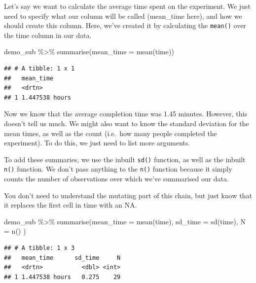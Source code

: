 \documentclass[
]{book}
\newenvironment{Shaded}{\begin{snugshade}}{\end{snugshade}}
\newcommand{\AttributeTok}[1]{\textcolor[rgb]{0.77,0.63,0.00}{#1}}
\newcommand{\FunctionTok}[1]{\textcolor[rgb]{0.00,0.00,0.00}{#1}}
\newcommand{\NormalTok}[1]{#1}
\newcommand{\SpecialCharTok}[1]{\textcolor[rgb]{0.00,0.00,0.00}{#1}}
\begin{document}
Let's say we want to calculate the average time spent on the experiment. We just need to specify what our column will be called (mean\_time here), and how we should create this column. Here, we've created it by calculating the \texttt{mean()} over the time column in our data.

\begin{Shaded}
\begin{Highlighting}[]
\NormalTok{demo\_sub }\SpecialCharTok{\%\textgreater{}\%} \FunctionTok{summarise}\NormalTok{(}\AttributeTok{mean\_time =} \FunctionTok{mean}\NormalTok{(time))}
\end{Highlighting}
\end{Shaded}

\begin{verbatim}
## # A tibble: 1 x 1
##   mean_time     
##   <drtn>        
## 1 1.447538 hours
\end{verbatim}

Now we know that the average completion time was 1.45 minutes. However, this doesn't tell us much. We might also want to know the standard deviation for the mean times, as well as the count (i.e.~how many people completed the experiment). To do this, we just need to list more arguments.

To add these summaries, we use the inbuilt \texttt{sd()} function, as well as the inbuilt \texttt{n()} function. We don't pass anything to the \texttt{n()} function because it simply counts the number of observations over which we've summarised our data.

You don't need to understand the mutating part of this chain, but just know that it replaces the first cell in time with an NA.

\begin{Shaded}
\begin{Highlighting}[]
\NormalTok{demo\_sub }\SpecialCharTok{\%\textgreater{}\%} 
  \FunctionTok{summarise}\NormalTok{(}\AttributeTok{mean\_time =} \FunctionTok{mean}\NormalTok{(time),}
           \AttributeTok{sd\_time =} \FunctionTok{sd}\NormalTok{(time),}
           \AttributeTok{N =} \FunctionTok{n}\NormalTok{()}
\NormalTok{           )}
\end{Highlighting}
\end{Shaded}

\begin{verbatim}
## # A tibble: 1 x 3
##   mean_time      sd_time     N
##   <drtn>           <dbl> <int>
## 1 1.447538 hours   0.275    29
\end{verbatim}
\end{document}
